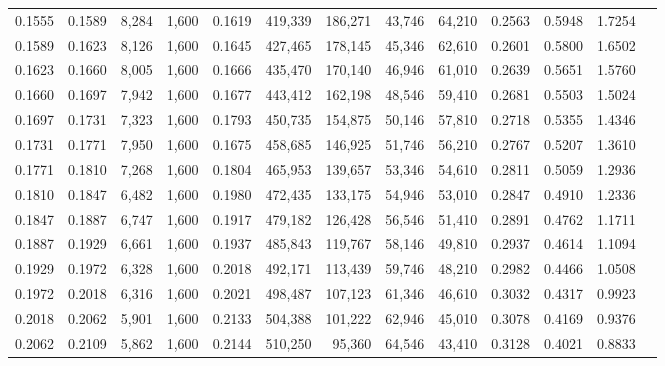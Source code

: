 \begin{tabular}{rrrrrrrrrrrrr}
0.1555 & 0.1589 &  8,284 & 1,600 &                                     0.1619 & 419,339 & 186,271 &  43,746 &  64,210 & 0.2563 & 0.5948 & 1.7254 \\
0.1589 & 0.1623 &  8,126 & 1,600 &                                     0.1645 & 427,465 & 178,145 &  45,346 &  62,610 & 0.2601 & 0.5800 & 1.6502 \\
0.1623 & 0.1660 &  8,005 & 1,600 &                                     0.1666 & 435,470 & 170,140 &  46,946 &  61,010 & 0.2639 & 0.5651 & 1.5760 \\
0.1660 & 0.1697 &  7,942 & 1,600 &                                     0.1677 & 443,412 & 162,198 &  48,546 &  59,410 & 0.2681 & 0.5503 & 1.5024 \\
0.1697 & 0.1731 &  7,323 & 1,600 &                                     0.1793 & 450,735 & 154,875 &  50,146 &  57,810 & 0.2718 & 0.5355 & 1.4346 \\
0.1731 & 0.1771 &  7,950 & 1,600 &                                     0.1675 & 458,685 & 146,925 &  51,746 &  56,210 & 0.2767 & 0.5207 & 1.3610 \\
0.1771 & 0.1810 &  7,268 & 1,600 &                                     0.1804 & 465,953 & 139,657 &  53,346 &  54,610 & 0.2811 & 0.5059 & 1.2936 \\
0.1810 & 0.1847 &  6,482 & 1,600 &                                     0.1980 & 472,435 & 133,175 &  54,946 &  53,010 & 0.2847 & 0.4910 & 1.2336 \\
0.1847 & 0.1887 &  6,747 & 1,600 &                                     0.1917 & 479,182 & 126,428 &  56,546 &  51,410 & 0.2891 & 0.4762 & 1.1711 \\
0.1887 & 0.1929 &  6,661 & 1,600 &                                     0.1937 & 485,843 & 119,767 &  58,146 &  49,810 & 0.2937 & 0.4614 & 1.1094 \\
0.1929 & 0.1972 &  6,328 & 1,600 &                                     0.2018 & 492,171 & 113,439 &  59,746 &  48,210 & 0.2982 & 0.4466 & 1.0508 \\
0.1972 & 0.2018 &  6,316 & 1,600 &                                     0.2021 & 498,487 & 107,123 &  61,346 &  46,610 & 0.3032 & 0.4317 & 0.9923 \\
0.2018 & 0.2062 &  5,901 & 1,600 &                                     0.2133 & 504,388 & 101,222 &  62,946 &  45,010 & 0.3078 & 0.4169 & 0.9376 \\
0.2062 & 0.2109 &  5,862 & 1,600 &                                     0.2144 & 510,250 &  95,360 &  64,546 &  43,410 & 0.3128 & 0.4021 & 0.8833 \\

\end{tabular}

